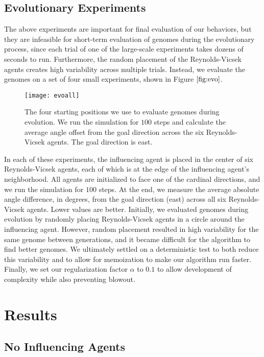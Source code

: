 \subsection{Evolutionary Experiments}
The above experiments are important for final evaluation of our behaviors, but
they are infeasible for short-term evaluation of genomes during
the evolutionary process, since each trial of one of the large-scale
experiments takes dozens of seconds to run.
Furthermore, the random placement of the Reynolds-Vicsek agents creates high
variability across multiple trials.
Instead, we evaluate the genomes on a set of four small experiments, shown in
Figure $\ref{fig:evo}$.
\begin{figure}
    \centering
    \texttt{[image: evoall]}
    \caption{The four starting positions we use to evaluate genomes during
    evolution.
    We run the simulation for $100$ steps and calculate the average angle offset
    from the goal direction across the six Reynolds-Vicsek agents.
    The goal direction is east.}
    \label{fig:evo}
\end{figure}
In each of these experiments, the influencing agent is placed in the center of
six Reynolds-Vicsek agents, each of which is at the edge of the influencing
agent's neighborhood.
All agents are initialized to face one of the cardinal directions, and we run
the simulation for $100$ steps.
At the end, we measure the average absolute angle difference, in degrees, from
the goal direction (east) across all six Reynolds-Vicsek agents.
Lower values are better.
Initially, we evaluated genomes during evolution by randomly placing
Reynolds-Vicsek agents in a circle around the influencing agent.
However, random placement resulted in high variability for the same genome
between generations, and it became difficult for the algorithm to find better
genomes.
We ultimately settled on a deterministic test to both reduce this variability
and to allow for memoization to make our algorithm run faster.
Finally, we set our regularization factor $\alpha$ to $0.1$ to allow
development of complexity while also preventing blowout.

\section{Results}
\subsection{No Influencing Agents}

